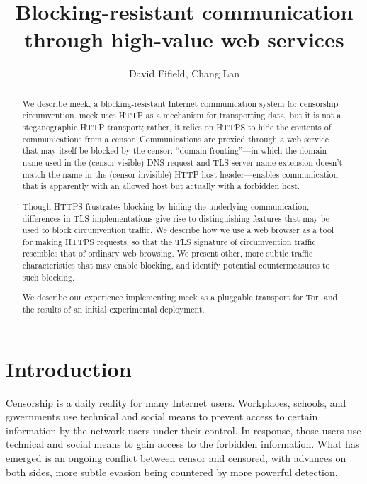 \documentclass{article}
\title{Blocking-resistant communication through high-value web services}
\author{David Fifield, Chang Lan}
\begin{document}
\maketitle

\begin{abstract}
We describe meek, a blocking-resistant Internet communication system for censorship circumvention.
meek uses HTTP as a mechanism for transporting data, but it is not a steganographic HTTP transport;
rather, it relies on HTTPS to hide the contents of communications from a censor.
Communications are proxied through a web service that may itself be blocked by the censor:
``domain fronting''---in which the domain name used in the (censor-visible)
DNS request and TLS server name extension doesn't match the name in the (censor-invisible)
HTTP host header---enables communication that is apparently with an allowed host
but actually with a forbidden host.

Though HTTPS frustrates blocking by hiding the underlying communication,
differences in TLS implementations give rise to distinguishing features
that may be used to block circumvention traffic.
We describe how we use a web browser as a tool for making HTTPS requests,
so that the TLS signature of circumvention traffic resembles that of ordinary web browsing.
We present other, more subtle traffic characteristics that may enable blocking,
and identify potential countermeasures to such blocking.

We describe our experience implementing meek as a pluggable transport for Tor,
and the results of an initial experimental deployment.
\end{abstract}

\section{Introduction}


Censorship is a daily reality for many Internet users.
Workplaces, schools, and governments use technical and social means
to prevent access to certain information by the network users under their control.
In response, those users use technical and social means
to gain access to the forbidden information.
What has emerged is an ongoing conflict between censor and censored,
with advances on both sides, more subtle evasion being countered by more powerful detection.
\end{document}
